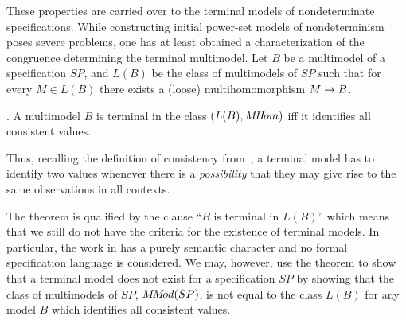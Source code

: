 {These properties are carried over to the terminal models of nondeterminate specifications. While 
constructing initial power-set models of nondeterminism poses severe problems, one has at least obtained 
a characterization of the congruence determining the terminal multimodel. Let $B$ be a multimodel of a 
specification $SP$, and $L(B)$ be the class of multimodels of $SP$ such 
that for every $M\in L(B)$ there exists a 
(loose) multihomomorphism $M\mathrel{\rightarrow} B$.
\begin{Theorem}\label{th:41}{\rm \cite{c:53}.} 
A multimodel $B$ is terminal in the class $(L(B),M\!H\!om)$ iff it identifies all 
consistent values. 
\end{Theorem}
Thus, recalling the definition of consistency from~, a terminal model has to identify two values 
whenever there is a {\em possibility} that they may give rise to the same observations in all contexts. 

The theorem is qualified by the clause ``$B$ is terminal in $L(B)$'' which means that we still do not have 
the criteria for the existence of terminal models. In particular, the work in \cite{c:53} has a purely semantic 
character and no formal specification language is considered. We may, however, use the theorem to show 
that a terminal model does not exist for a specification $SP$ by showing 
that the class of multimodels of $SP$, 
$M\!M\!od(SP)$, is not equal to the class $L(B)$ for any model $B$ which identifies all consistent values. 

}
